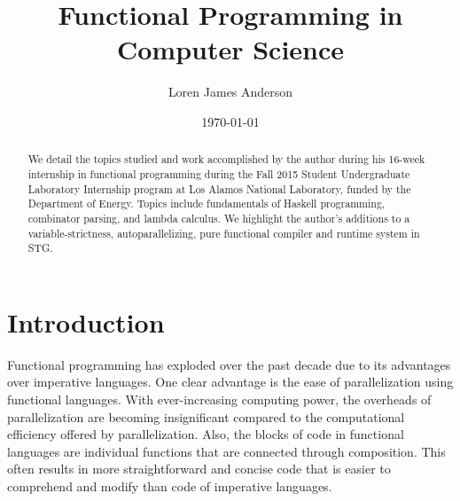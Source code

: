 \documentclass[11pt]{article}
\begin{document}
\title{Functional Programming in Computer Science}
\author{Loren James Anderson}
\date{\today}
\maketitle
\begin{abstract}
\noindent We detail the topics studied and work accomplished by the author during his 16-week internship in functional programming during the Fall 2015 Student Undergraduate Laboratory Internship program at Los Alamos National Laboratory, funded by the Department of Energy. Topics include fundamentals of Haskell programming, combinator parsing, and lambda calculus. We highlight the author's additions to a variable-strictness, autoparallelizing, pure functional compiler and runtime system in STG.
\end{abstract}
\section{Introduction}
Functional programming has exploded over the past decade due to its advantages over imperative languages. One clear advantage is the ease of parallelization using functional languages. With ever-increasing computing power, the overheads of parallelization are becoming insignificant compared to the computational efficiency offered by parallelization. Also, the blocks of code in functional languages are individual functions that are connected through composition. This often results in more straightforward and concise code that is easier to comprehend and modify than code of imperative languages. 
\end{document}
